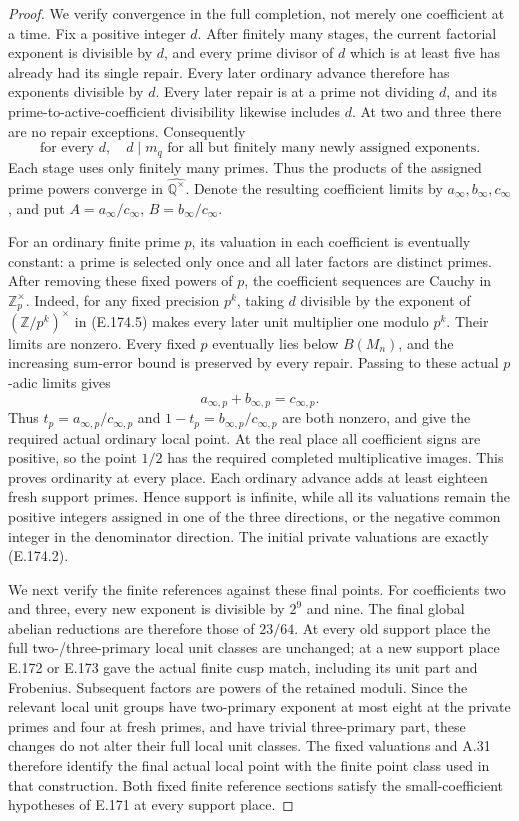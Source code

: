 \begin{proof}
We verify convergence in the full completion, not merely one
coefficient at a time. Fix a positive integer \(d\). After
finitely many stages, the current factorial exponent is divisible
by \(d\), and every prime divisor of \(d\) which is at
least five has already had its single repair. Every later ordinary
advance therefore has exponents divisible by \(d\). Every
later repair is at a prime not dividing \(d\), and its
prime-to-active-coefficient divisibility likewise includes
\(d\). At two and three there are no repair exceptions.
Consequently
\[
 \text{for every }d,\quad
 d\mid m_q\text{ for all but finitely many newly assigned exponents.}
 \tag{E.174.5}
\]
Each stage uses only finitely many primes. Thus the products of
the assigned prime powers converge in
\(\widehat{\mathbb Q^\times}\). Denote the resulting
coefficient limits by \(a_\infty,b_\infty,c_\infty\),
and put \(A=a_\infty/c_\infty\),
\(B=b_\infty/c_\infty\).

For an ordinary finite prime \(p\), its valuation in each
coefficient is eventually constant: a prime is selected only
once and all later factors are distinct primes. After removing
these fixed powers of \(p\), the coefficient sequences are
Cauchy in \(\mathbb Z_p^\times\). Indeed, for any fixed
precision \(p^k\), taking \(d\) divisible by the exponent
of \((\mathbb Z/p^k)^\times\) in (E.174.5) makes every
later unit multiplier one modulo \(p^k\). Their limits are
nonzero. Every fixed \(p\) eventually lies below \(B(M_n)\),
and the increasing sum-error bound is preserved by every repair.
Passing to these actual \(p\)-adic limits gives
\[
                 a_{\infty,p}+b_{\infty,p}=c_{\infty,p}.
 \tag{E.174.6}
\]
Thus \(t_p=a_{\infty,p}/c_{\infty,p}\) and
\(1-t_p=b_{\infty,p}/c_{\infty,p}\) are both nonzero,
and give the required actual ordinary local point. At the real
place all coefficient signs are positive, so the point \(1/2\)
has the required completed multiplicative images. This proves
ordinarity at every place. Each ordinary advance adds at least
eighteen fresh support primes. Hence support is infinite, while
all its valuations remain the positive integers assigned in one
of the three directions, or the negative common integer in the
denominator direction. The initial private valuations are exactly
(E.174.2).

We next verify the finite references against these final points.
For coefficients two and three, every new exponent is divisible
by \(2^9\) and nine. The final global abelian reductions are
therefore those of \(23/64\). At every old support place the
full two-/three-primary local unit classes are unchanged; at a
new support place E.172 or E.173 gave the actual finite cusp
match, including its unit part and Frobenius. Subsequent factors
are powers of the retained moduli. Since the relevant local
unit groups have two-primary exponent at most eight at the
private primes and four at fresh primes, and have trivial
three-primary part, these changes do not alter their full local
unit classes. The fixed valuations and A.31 therefore identify
the final actual local point with the finite point class used in
that construction. Both fixed finite reference sections satisfy
the small-coefficient hypotheses of E.171 at every support place.


\end{proof}
